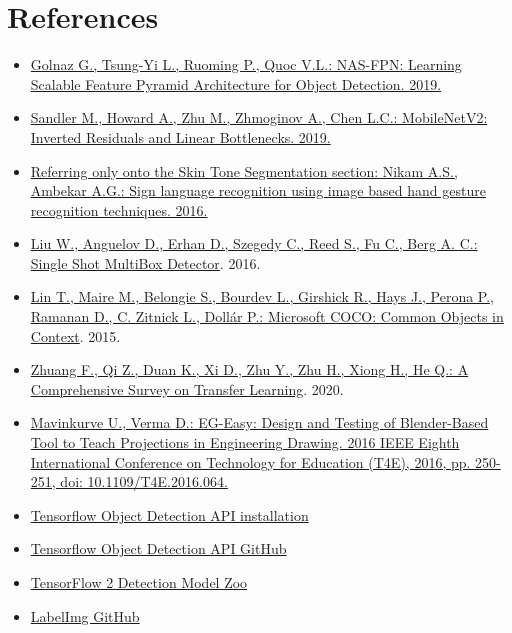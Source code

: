 \documentclass[a4paper, 12pt]{article}
\begin{document}
\section{References}
\label{References}
\begin{flushleft}
\begin{itemize}
    \item \label{RefSSD} \href{https://arxiv.org/pdf/1904.07392}{Golnaz G., Tsung-Yi L., Ruoming P., Quoc V.L.: NAS-FPN: Learning Scalable Feature Pyramid Architecture for Object Detection. 2019.}
    \item \label{RefArchSSD} \href{https://arxiv.org/pdf/1801.04381.pdf}{Sandler M., Howard A., Zhu M., Zhmoginov A., Chen L.C.: MobileNetV2: Inverted Residuals and Linear Bottlenecks. 2019.}
    \item  \href{https://ieeexplore.ieee.org/document/7916786}{Referring only onto the Skin Tone Segmentation section: Nikam A.S., Ambekar A.G.: Sign language recognition using image based hand gesture recognition techniques. 2016.}
    \item \label{Ref1} \href{https://arxiv.org/abs/1512.02325}{Liu W., Anguelov D., Erhan D., Szegedy C., Reed S., Fu C., Berg A. C.: Single Shot MultiBox Detector}. 2016.
    \item \label{Ref2} \href{https://arxiv.org/abs/1405.0312}{Lin T., Maire M., Belongie S., Bourdev L., Girshick R., Hays J., Perona P., Ramanan D., C. Zitnick L., Dollár P.: Microsoft COCO: Common Objects in Context}. 2015.
    \item \label{Ref3} \href{https://arxiv.org/abs/1911.02685}{Zhuang F., Qi Z., Duan K., Xi D., Zhu Y., Zhu H., Xiong H., He Q.: A Comprehensive Survey on Transfer Learning}. 2020.
    \item \label{Ref4} \href{https://ieeexplore.ieee.org/document/7814839}{Mavinkurve U., Verma D.: EG-Easy: Design and Testing of Blender-Based Tool to Teach Projections in Engineering Drawing. 2016 IEEE Eighth International Conference on Technology for Education (T4E), 2016, pp. 250-251, doi: 10.1109/T4E.2016.064.}
    \item \label{Ref8} \href{https://tensorflow-object-detection-api-tutorial.readthedocs.io/en/latest/}{Tensorflow Object Detection API installation}
    \item \label{Ref9} \href{https://github.com/tensorflow/models/tree/master/research/object_detection}{Tensorflow Object Detection API GitHub}
    \item \label{Ref10} \href{https://github.com/tensorflow/models/blob/master/research/object_detection/g3doc/tf2_detection_zoo.md}{TensorFlow 2 Detection Model Zoo}
    \item \label{Ref11} \href{https://github.com/tzutalin/labelImg}{LabelImg GitHub}
\end{itemize}
\end{flushleft}
\end{document}
